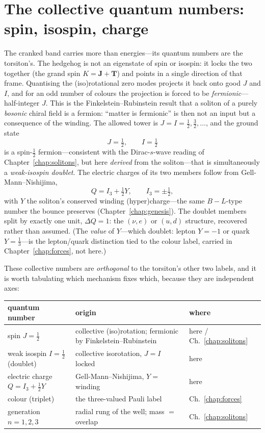 \section{The collective quantum numbers: spin, isospin, charge}
\label{sec:collective-qn}
The cranked band carries more than energies---its quantum numbers are the torsiton's. The hedgehog is
not an eigenstate of spin or isospin: it locks the two together (the grand spin $K=\mathbf J+\mathbf
T$) and points in a single direction of that frame. Quantising the (iso)rotational zero modes projects
it back onto good $J$ and $I$, and for an odd number of colours the projection is forced to be
\emph{fermionic}---half-integer $J$. This is the Finkelstein--Rubinstein result that a soliton of a
purely \emph{bosonic} chiral field is a fermion: ``matter is fermionic'' is then not an input but a
consequence of the winding. The allowed tower is $J=I=\tfrac12,\tfrac32,\dots$, and the ground state
\begin{equation}
  J=\tfrac12,\qquad I=\tfrac12
\end{equation}
is a spin-$\tfrac12$ fermion---consistent with the Dirac-$s$-wave reading of
Chapter~\ref{chap:solitons}, but here \emph{derived} from the soliton---that is simultaneously a
\emph{weak-isospin doublet}. The electric charges of its two members follow from
Gell-Mann--Nishijima,
\begin{equation}
  Q = I_3 + \tfrac12 Y,\qquad I_3 = \pm\tfrac12,
  \label{eq:gmn}
\end{equation}
with $Y$ the soliton's conserved winding (hyper)charge---the same $B\!-\!L$-type number the bounce
preserves (Chapter~\ref{chap:genesis}). The doublet members split by exactly one unit, $\Delta Q=1$:
the $(\nu,e)$ or $(u,d)$ structure, recovered rather than assumed. (The \emph{value} of $Y$---which
doublet: lepton $Y=-1$ or quark $Y=\tfrac13$---is the lepton/quark distinction tied to the colour
label, carried in Chapter~\ref{chap:forces}, not here.)

These collective numbers are \emph{orthogonal} to the torsiton's other two labels, and it is worth
tabulating which mechanism fixes which, because they are independent axes:

\begin{center}\small
\begin{tabular}{lll}
\hline
quantum number & origin & where \\
\hline
spin $J=\tfrac12$ & collective (iso)rotation; fermionic by Finkelstein--Rubinstein & here / Ch.~\ref{chap:solitons} \\
weak isospin $I=\tfrac12$ (doublet) & collective isorotation, $J{=}I$ locked & here \\
electric charge $Q=I_3+\tfrac12Y$ & Gell-Mann--Nishijima, $Y=$ winding & here \\
colour (triplet) & the three-valued Pauli label & Ch.~\ref{chap:forces} \\
generation $n=1,2,3$ & radial rung of the well; mass $=$ overlap & Ch.~\ref{chap:solitons} \\
\hline
\end{tabular}
\end{center}

